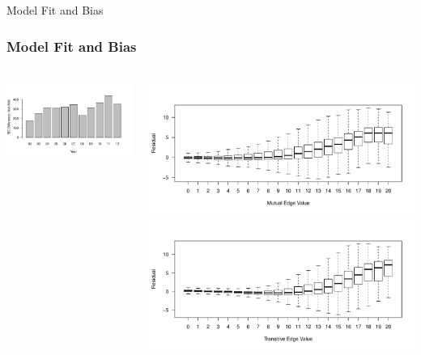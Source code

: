 \documentclass{beamer}
\begin{document}
\begin{frame}{Model Fit and Bias}

\frametitle{Model Fit and Bias}
\begin{columns}[T]
    \begin{column}{.5\textwidth}
\includegraphics[scale=.4]{slides_figures/BICdiff.pdf}  
    \end{column}
    \begin{column}{.5\textwidth}
    \includegraphics[scale=.3]{slides_figures/mutualBoxplot.pdf}\vfill
    \includegraphics[scale=.3]{slides_figures/transitiveBoxplot.pdf}
        \end{column}
  \end{columns}





\end{frame}
\end{document}
